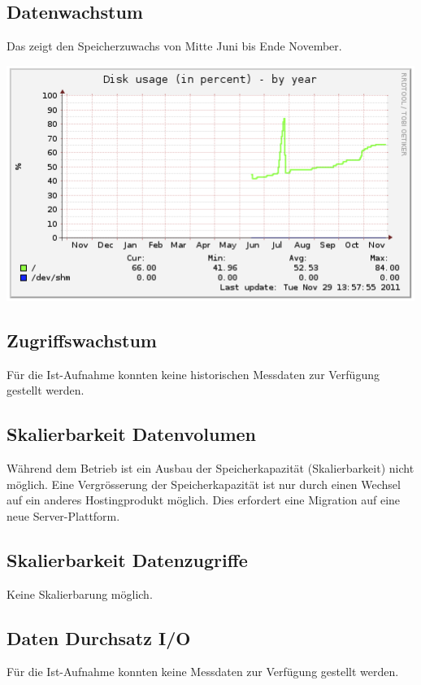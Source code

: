 \subsection{Datenwachstum}
Das  zeigt den Speicherzuwachs von Mitte Juni bis Ende November.

\begin{center}
\includegraphics[width=\linewidth, keepaspectratio = true]{media/disk-usage-by-year.png}
\end{center}

\subsection{Zugriffswachstum}
Für die Ist-Aufnahme konnten keine historischen Messdaten zur Verfügung gestellt werden.

\subsection{Skalierbarkeit Datenvolumen}
Während dem Betrieb ist ein Ausbau der Speicherkapazität (Skalierbarkeit) nicht möglich. Eine Vergrösserung der Speicherkapazität ist nur durch einen Wechsel auf ein anderes Hostingprodukt möglich. Dies erfordert eine Migration auf eine neue Server-Plattform. 

\subsection{Skalierbarkeit Datenzugriffe}
Keine Skalierbarung möglich. 

\subsection{Daten Durchsatz I/O}
Für die Ist-Aufnahme konnten keine Messdaten zur Verfügung gestellt werden.

